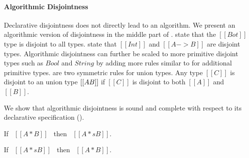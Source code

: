 \paragraph{Algorithmic Disjointness}
Declarative disjointness does not directly lead to an algorithm.
We present an algorithmic version of disjointness in
the middle part of .
 state that the $[[Bot]]$
type is disjoint to all types.   state that
$[[Int]]$ and $[[A -> B]]$ are disjoint types.  Algorithmic
disjointness can further be scaled to more primitive disjoint types
such as $Bool$ and $String$ by adding more rules similar to
 for additional primitive types.
 are two symmetric rules for union types. Any type $[[C]]$ is
disjoint to an union type $[[A \/ B]]$ if $[[C]]$ is disjoint to both
$[[A]]$ and $[[B]]$.

We show that algorithmic disjointness is sound and complete
with respect to its declarative specification ().

\begin{lemma}
  If \ $[[A * B]]$ \ then \ $[[A *s B]]$.
\label{lemma:union:disj-sound}
\end{lemma}

\begin{comment}
\begin{proof}
  By induction on algorithmic disjointness relation.
  \begin{itemize}
    \item Cases \rref{ad-btmr, ad-btml, ad-orl, ad-orr} require induction on hypothesis
          and \Cref{lemma:union:sub-or}.
    \item Cases \rref{ad-intl, ad-intr} require induction on type and \Cref{lemma:union:sub-or}.
  \end{itemize}
\end{proof}
\end{comment}

\begin{lemma}
  If \ $[[A *s B]]$ \ then \ $[[A * B]]$.
\label{lemma:union:disj-complete}
\end{lemma}

